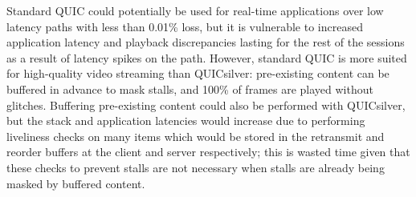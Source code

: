 \documentclass{mpaper}
\begin{document}
Standard QUIC could potentially be used for real-time applications over low latency paths with less than 0.01\% loss, but it is vulnerable to increased application latency and playback discrepancies lasting for the rest of the sessions as a result of latency spikes on the path. However, standard QUIC is more suited for high-quality video streaming than QUICsilver: pre-existing content can be buffered in advance to mask stalls, and 100\% of frames are played without glitches. Buffering pre-existing content could also be performed with QUICsilver, but the stack and application latencies would increase due to performing liveliness checks on many items which would be stored in the retransmit and reorder buffers at the client and server respectively; this is wasted time given that these checks to prevent stalls are not necessary when stalls are already being masked by buffered content. 




\end{document}

